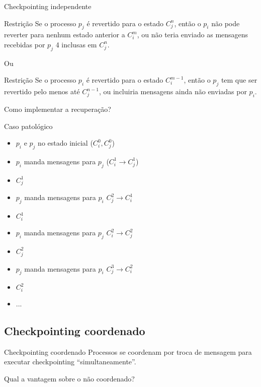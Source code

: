 \begin{frame}{Checkpointing independente}
\begin{block}{Restrição}
Se o processo $p_j$ é revertido para o estado $C_j^n$, então o $p_i$ não pode reverter para nenhum estado anterior a $C_i^m$, ou não teria enviado as mensagens recebidas por $p_j$ 4 inclusas em $C_j^n$.
\end{block}

Ou

\begin{block}{Restrição}
Se o processo $p_i$ é revertido para o estado $C_i^{m-1}$, então o $p_j$ tem que ser revertido pelo menos até $C_j^{n-1}$, ou incluiria mensagens ainda não enviadas por $p_i$.
\end{block}

\pause Como implementar a recuperação?
\end{frame}

\begin{frame}{Caso patológico}
\begin{itemize}
	\item $p_i$ e $p_j$ no estado inicial ($C_i^0, C_j^0$)
	\item $p_i$ manda mensagens para $p_j$ ($C_i^1 \rightarrow C_j^1$)
	\item $C_j^1$
	\item $p_j$ manda mensagens para $p_i$ $C_j^2 \rightarrow C_i^1$
	\item $C_i^1$
	\item $p_i$ manda mensagens para $p_j$ $C_i^2 \rightarrow C_j^2$
	\item $C_j^2$
	\item $p_j$ manda mensagens para $p_i$ $C_j^3 \rightarrow C_i^2$
	\item $C_i^2$
	\item ...
\end{itemize}
\end{frame}



\subsection{Checkpointing coordenado}

\begin{frame}{Checkpointing coordenado}
Processos se coordenam por troca de mensagem para executar checkpointing ``simultaneamente''.

\pause Qual a vantagem sobre o não coordenado?

\end{frame}


